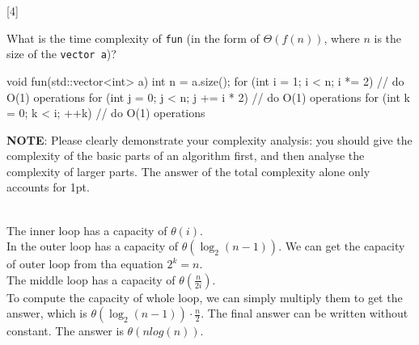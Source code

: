 [4]

What is the time complexity of \lstinline{fun} (in the form of \(\Theta(f(n))\), where \(n\) is the size of the \lstinline{vector a})?

\begin{cpp}
    void fun(std::vector<int> a) {
            int n = a.size();
            for (int i = 1; i < n; i *= 2) {
                    // do O(1) operations
                    for (int j = 0; j < n; j += i * 2) {
                            // do O(1) operations
                            for (int k = 0; k < i; ++k) {
                                    // do O(1) operations
                                }
                        }
                }
        }
\end{cpp}

\textbf{NOTE}: Please clearly demonstrate your complexity analysis: you should give the complexity of the basic parts of an algorithm first, and then analyse the complexity of larger parts. The answer of the total complexity alone only accounts for 1pt.

\begin{solution} \\
    The inner loop has a capacity of $\theta(i)$. \\
    In the outer loop has a capacity of $\theta(\log_{2}{(n - 1)})$. We can get the capacity of outer
    loop from tha equation $2^k = n$. \\
    The middle loop has a capacity of $\theta(\frac{n}{2i})$. \\
    To compute the capacity of whole loop, we can simply multiply them to get the answer, which
    is $\theta(\log_{2}{(n - 1)}) \cdot \frac{n}{2}$. The final answer can be written without constant.
    The answer is $\theta(nlog(n))$.
\end{solution}